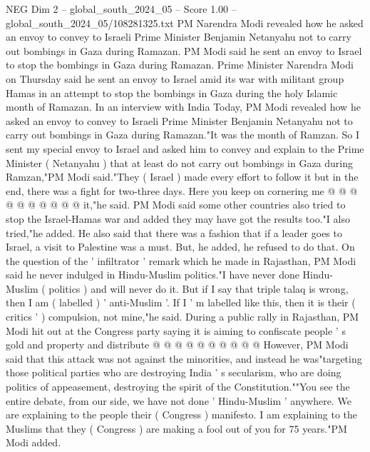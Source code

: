 \begin{textsample}{NEG Dim 2 – global\_south\_2024\_05 – Score 1.00 – global\_south\_2024\_05/108281325.txt}  \label{ex:f2_neg_377}
PM Narendra Modi revealed how he asked an envoy to convey to Israeli Prime Minister Benjamin Netanyahu not to carry out bombings in Gaza during Ramazan.
PM Modi said he sent an envoy to Israel to stop the bombings in Gaza during Ramazan.
Prime Minister Narendra Modi on Thursday said he sent an envoy to Israel amid its war with militant group Hamas in an attempt to stop the bombings in Gaza during the holy Islamic month of Ramazan.
In an interview with India Today, PM Modi revealed how he asked an envoy to convey to Israeli Prime Minister Benjamin Netanyahu not to carry out bombings in Gaza during Ramazan."It was the month of Ramzan.
So I sent my special envoy to Israel and asked him to convey and explain to the Prime Minister ( Netanyahu ) that at least do not carry out bombings in Gaza during Ramzan,"PM Modi said."They ( Israel ) made every effort to follow it but in the end, there was a fight for two-three days.
Here you keep on cornering me @ @ @ @ @ @ @ @ @ @ it,"he said.
PM Modi said some other countries also tried to stop the Israel-Hamas war and added they may have got the results too."I also tried,"he added.
He also said that there was a fashion that if a leader goes to Israel, a visit to Palestine was a must.
But, he added, he refused to do that.
On the question of the ' infiltrator ' remark which he made in Rajasthan, PM Modi said he never indulged in Hindu-Muslim politics."I have never done Hindu-Muslim ( politics ) and will never do it.
But if I say that triple talaq is wrong, then I am ( labelled ) ' anti-Muslim '.
If I ' m labelled like this, then it is their ( critics ' ) compulsion, not mine,"he said.
During a public rally in Rajasthan, PM Modi hit out at the Congress party saying it is aiming to confiscate people ' s gold and property and distribute @ @ @ @ @ @ @ @ @ @ However, PM Modi said that this attack was not against the minorities, and instead he was"targeting those political parties who are destroying India ' s secularism, who are doing politics of appeasement, destroying the spirit of the Constitution.""You see the entire debate, from our side, we have not done ' Hindu-Muslim ' anywhere.
We are explaining to the people their ( Congress ) manifesto.
I am explaining to the Muslims that they ( Congress ) are making a fool out of you for 75 years."PM Modi added.

\end{textsample}

